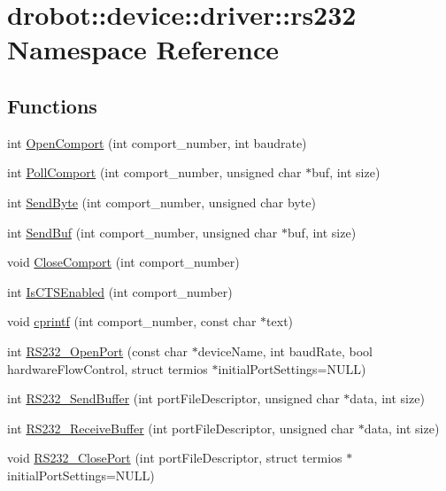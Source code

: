 \hypertarget{namespacedrobot_1_1device_1_1driver_1_1rs232}{\section{drobot\-:\-:device\-:\-:driver\-:\-:rs232 Namespace Reference}
\label{namespacedrobot_1_1device_1_1driver_1_1rs232}
}
\subsection*{Functions}
\begin{DoxyCompactItemize}
\item 
int \hyperlink{namespacedrobot_1_1device_1_1driver_1_1rs232_a55e7b12a0dfb2cb7265522766fddebaf}{Open\-Comport} (int comport\-\_\-number, int baudrate)
\item 
int \hyperlink{namespacedrobot_1_1device_1_1driver_1_1rs232_aa417ecfc1ba868989ec18f787275ed69}{Poll\-Comport} (int comport\-\_\-number, unsigned char $\ast$buf, int size)
\item 
int \hyperlink{namespacedrobot_1_1device_1_1driver_1_1rs232_a4ef479c1440bd5d22068642ab2e13bc3}{Send\-Byte} (int comport\-\_\-number, unsigned char byte)
\item 
int \hyperlink{namespacedrobot_1_1device_1_1driver_1_1rs232_aa6270717bc8209ccbeeb98e93e802da4}{Send\-Buf} (int comport\-\_\-number, unsigned char $\ast$buf, int size)
\item 
void \hyperlink{namespacedrobot_1_1device_1_1driver_1_1rs232_a405a5bce099ba38295976fb41ceec699}{Close\-Comport} (int comport\-\_\-number)
\item 
int \hyperlink{namespacedrobot_1_1device_1_1driver_1_1rs232_a7e6efe44c2665e9d7c5297a79fca51e4}{Is\-C\-T\-S\-Enabled} (int comport\-\_\-number)
\item 
void \hyperlink{namespacedrobot_1_1device_1_1driver_1_1rs232_a1d12f5eb9355f4cebb52a9f22aede369}{cprintf} (int comport\-\_\-number, const char $\ast$text)
\item 
int \hyperlink{namespacedrobot_1_1device_1_1driver_1_1rs232_a1ee6c751cb5c1177fd7097e5ae2edcd5}{R\-S232\-\_\-\-Open\-Port} (const char $\ast$device\-Name, int baud\-Rate, bool hardware\-Flow\-Control, struct termios $\ast$initial\-Port\-Settings=N\-U\-L\-L)
\item 
int \hyperlink{namespacedrobot_1_1device_1_1driver_1_1rs232_a33aa7dced082cac8e6e93191ffaf3253}{R\-S232\-\_\-\-Send\-Buffer} (int port\-File\-Descriptor, unsigned char $\ast$data, int size)
\item 
int \hyperlink{namespacedrobot_1_1device_1_1driver_1_1rs232_a072a649319a6b7b2bfbd92860061df3c}{R\-S232\-\_\-\-Receive\-Buffer} (int port\-File\-Descriptor, unsigned char $\ast$data, int size)
\item 
void \hyperlink{namespacedrobot_1_1device_1_1driver_1_1rs232_acabd23b8d64627c75d084c6d5eff8795}{R\-S232\-\_\-\-Close\-Port} (int port\-File\-Descriptor, struct termios $\ast$initial\-Port\-Settings=N\-U\-L\-L)
\end{DoxyCompactItemize}
